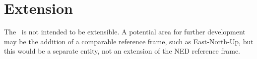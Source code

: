 %
%
% 
%

 \section{Extension}

The \NEDDesc\ is not intended to be extensible.  A potential area for further development may be the addition of a comparable reference frame, such as East-North-Up, but this would be a separate entity, not an extension of the NED reference frame.